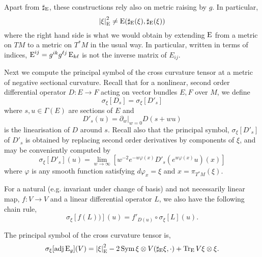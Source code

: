 \documentclass[a4paper, 12pt]{amsart}
\begin{document}
\begin{rem}
Apart from \(\sharp_{\operatorname{E}}\), these constructions rely also on metric raising by \(g\). In particular,
\[
\left\lvert{\xi}\right\rvert^2_{\operatorname{E}} \ne \operatorname{E}(\sharp_{\operatorname{E}} (\xi), \sharp_{\operatorname{E}} (\xi))
\]
where the right hand side is what we would obtain by extending \(\operatorname{E}\) from a metric on \(TM\) to a metric on \(T^{\ast} M\) in the usual way. In particular, written in terms of indices, \(\operatorname{E}^{ij} = g^{ik}g^{\ell j} \operatorname{E}_{k\ell}\) is not the inverse matrix of \(E_{ij}\).
\end{rem}

Next we compute the principal symbol of the cross curvature tensor at a metric of negative sectional curvature. Recall that for a nonlinear, second order differential operator \(D : E \to F\) acting on vector bundles \(E, F\) over \(M\), we define
\begin{equation}
\label{eq:symbol}
\sigma_{\xi} [D_s] = \sigma_{\xi} [D'_s]
\end{equation}
where \(s, u \in \Gamma(E)\) are sections of \(E\) and
\[
D'_s (u) = \partial_w|_{w=0} D(s + w u)
\]
is the linearisation of \(D\) around \(s\). Recall also that the principal symbol, \(\sigma_{\xi} [D'_s]\) of \(D'_s\) is obtained by replacing second order derivatives by components of \(\xi\), and may be conveniently computed by
\begin{equation}
\label{eq:symbol_compute}
\sigma_{\xi} [D'_s] (u) = \lim_{w\to \infty} \left[w^{-2} e^{-w\varphi(x)} D'_s (e^{w\varphi(x)} u)(x)\right]
\end{equation}
where \(\varphi\) is any smooth function satisfying \(d\varphi_x = \xi\) and \(x = \pi_{T^{\ast}M} (\xi)\).

For a natural (e.g. invariant under change of basis) and not necessarily linear map, \(f : V \to V\) and a linear differential operator \(L\), we also have the following chain rule,
\begin{equation}
\label{eq:chain_rule}
\sigma_{\xi} [f(L))] (u) = f'_{D(u)} \circ \sigma_{\xi}[L] (u).
\end{equation}

\begin{lemma}
\label{lem:xcf_symbol}

The principal symbol of the cross curvature tensor is,
\[
\sigma_{\xi} [\operatorname{adj}\operatorname{E}_g] (V) = \left\lvert{\xi}\right\rvert^2_{\operatorname{E}} - 2 \operatorname{Sym} \xi \otimes V(\sharp_{\operatorname{E}}\xi, \cdot) + \operatorname{Tr}_{\operatorname{E}} V \xi \otimes \xi.
\]
\end{lemma}
\end{document}
